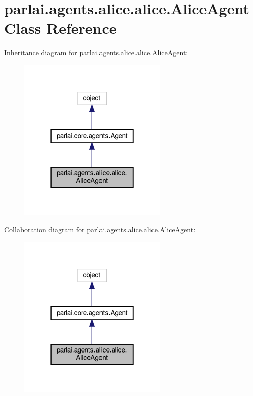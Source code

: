 \hypertarget{classparlai_1_1agents_1_1alice_1_1alice_1_1AliceAgent}{}\section{parlai.\+agents.\+alice.\+alice.\+Alice\+Agent Class Reference}
\label{classparlai_1_1agents_1_1alice_1_1alice_1_1AliceAgent}


Inheritance diagram for parlai.\+agents.\+alice.\+alice.\+Alice\+Agent\+:
\nopagebreak
\begin{figure}[H]
\begin{center}
\leavevmode
\includegraphics[width=202pt]{df/d8f/classparlai_1_1agents_1_1alice_1_1alice_1_1AliceAgent__inherit__graph}
\end{center}
\end{figure}


Collaboration diagram for parlai.\+agents.\+alice.\+alice.\+Alice\+Agent\+:
\nopagebreak
\begin{figure}[H]
\begin{center}
\leavevmode
\includegraphics[width=202pt]{d7/d82/classparlai_1_1agents_1_1alice_1_1alice_1_1AliceAgent__coll__graph}
\end{center}
\end{figure}
